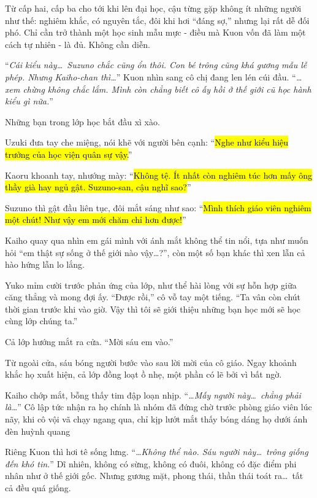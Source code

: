 \documentclass[../main.tex]{subfiles}
\begin{document}
Từ cấp hai, cấp ba cho tới khi lên đại học, cậu từng gặp không ít những người như thế: nghiêm khắc, có nguyên tắc, đôi khi hơi ``đáng sợ,'' nhưng lại rất dễ đối phó. Chỉ cần trở thành một học sinh mẫu mực - điều mà Kuon vốn đã làm một cách tự nhiên - là đủ. Không cần diễn.

``\textit{Cái kiểu này\dots\ Suzuno chắc cũng ổn thôi.  Con bé trông cũng khá gương mẫu lễ phép. Nhưng Kaiho-chan thì\dots}'' Kuon nhìn sang cô chị đang len lén cúi đầu. ``\textit{\dots xem chừng không chắc lắm. Mình còn chẳng biết cô ấy hồi ở thế giới cũ học hành kiểu gì nữa.}''

Những bạn trong lớp học bắt đầu xì xào.

Uzuki đưa tay che miệng, nói khẽ với người bên cạnh: ``\hl{Nghe như kiểu hiệu trưởng của học viện quân sự vậy.}''

Kaoru khoanh tay, nhướng mày: ``\hl{Không tệ. Ít nhất còn nghiêm túc hơn mấy ông thầy già hay ngủ gật. Suzuno-san, cậu nghĩ sao?}''

Suzuno thì gật đầu liên tục, đôi mắt sáng như sao: ``\hl{Mình thích giáo viên nghiêm một chút! Như vậy em mới chăm chỉ hơn được!}''

Kaiho quay qua nhìn em gái mình với ánh mắt không thể tin nổi, tựa như muốn hỏi ``em thật sự sống ở thế giới nào vậy\dots?'', còn một số bạn khác thì xen lẫn cả hào hứng lẫn lo lắng.

Yuko mỉm cười trước phản ứng của lớp, như thể hài lòng với sự hỗn hợp giữa căng thẳng và mong đợi ấy. ``Được rồi,'' cô vỗ tay một tiếng. ``Ta vân còn chút thời gian trước khi vào giờ. Vậy thì tôi sẽ giới thiệu những bạn học mới sẽ học cùng lớp chúng ta.''

Cả lớp hướng mắt ra cửa. ``Mời sáu em vào.''

Từ ngoài cửa, sáu bóng người bước vào sau lời mời của cô giáo. Ngay khoảnh khắc họ xuất hiện, cả lớp đồng loạt ồ nhẹ, một phần có lẽ bởi vì bất ngờ.

Kaiho chớp mắt, bỗng thấy tim đập loạn nhịp. ``\textit{\dots Mấy người này\dots\ chẳng phải là\dots}'' Cô lập tức nhận ra họ chính là nhóm đã đứng chờ trước phòng giáo viên lúc nãy, khi cô vội vã chạy ngang qua, chỉ kịp lướt mắt thấy bóng dáng họ dưới ánh đèn huỳnh quang

Riêng Kuon thì hơi tê sống lưng. ``\textit{\dots Không thể nào. Sáu người này\dots\ trông giống đến khó tin.}'' Dĩ nhiên, không có sừng, không có đuôi, không có đặc điểm phi nhân như ở thế giới gốc. Nhưng gương mặt, phong thái, thần thái toát ra\dots\ tất cả đều quá giống.
\end{document}

